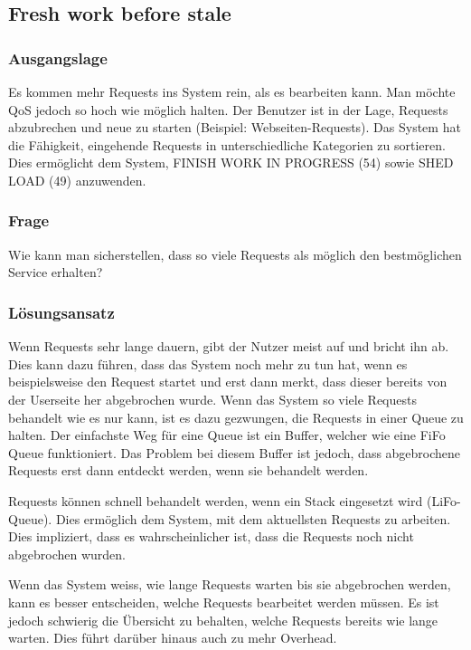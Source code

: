 \subsection{Fresh work before stale}

\subsubsection*{Ausgangslage}


Es kommen mehr Requests ins System rein, als es bearbeiten kann. Man möchte QoS jedoch so hoch wie möglich halten.
Der Benutzer ist in der Lage, Requests abzubrechen und neue zu starten (Beispiel: Webseiten-Requests).
Das System hat die Fähigkeit, eingehende Requests in unterschiedliche Kategorien zu sortieren. Dies ermöglicht dem System, FINISH WORK IN PROGRESS (54) sowie SHED LOAD (49) anzuwenden.

\subsubsection*{Frage}


Wie kann man sicherstellen, dass so viele Requests als möglich den bestmöglichen Service erhalten?

\subsubsection*{Lösungsansatz}


Wenn Requests sehr lange dauern, gibt der Nutzer meist auf und bricht ihn ab. Dies kann dazu führen, dass das System noch mehr zu tun hat, wenn es beispielsweise den Request startet und erst dann merkt, dass dieser bereits von der Userseite her abgebrochen wurde.
Wenn das System so viele Requests behandelt wie es nur kann, ist es dazu gezwungen, die Requests in einer Queue zu halten. Der einfachste Weg für eine Queue ist ein Buffer, welcher wie eine FiFo Queue funktioniert. Das Problem bei diesem Buffer ist jedoch, dass abgebrochene Requests erst dann entdeckt werden, wenn sie behandelt werden.

Requests können schnell behandelt werden, wenn ein Stack eingesetzt wird (LiFo-Queue). Dies ermöglich dem System, mit dem aktuellsten Requests zu arbeiten. Dies impliziert, dass es wahrscheinlicher ist, dass die Requests noch nicht abgebrochen wurden.

Wenn das System weiss, wie lange Requests warten bis sie abgebrochen werden, kann es besser entscheiden, welche Requests bearbeitet werden müssen. Es ist jedoch schwierig die Übersicht zu behalten, welche Requests bereits wie lange warten. Dies führt darüber hinaus auch zu mehr Overhead.
